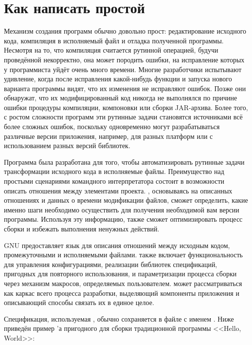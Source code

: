 \chapter{Как написать простой \Makefile{}}
\label{chap:simple_makefile}
Механизм создания программ обычно довольно прост: редактирование
исходного кода, компиляция в исполняемый файл и отладка полученной
программы. Несмотря на то, что компиляция считается рутинной
операцией, будучи проведённой некорректно, она может породить ошибки,
на исправление которых у программиста уйдёт очень много времени.
Многие разработчики испытывают удивление, когда после исправления
какой-нибудь функции и запуска нового варианта программы видят,
что их изменения не исправляют ошибок. Позже они обнаружат, что их
модифицированный код никогда не выполнялся по причине ошибки процедуры
компиляции, компоновки или сборки JAR\hyp{}архива. Более того, с
ростом сложности программ эти рутинные задачи становятся источниками
всё более сложных ошибок, поскольку одновременно могут разрабатываться
различные версии приложения, например, для разных платформ или с
использованием разных версий библиотек.

Программа \GNUmake{} была разработана для того, чтобы автоматизировать
рутинные задачи трансформации исходного кода в исполняемые файлы.
Преимущество \GNUmake{} над простыми сценариями командного
интерпретатора состоит в возможности описать отношения между
элементами проекта. \GNUmake{}, основываясь на описанных отношениях и
данных о времени модификации файлов, сможет определить, какие именно
шаги необходимо осуществить для получения необходимой вам версии
программы. Используя эту информацию, \GNUmake{} также сможет
оптимизировать процесс сборки и избежать выполнения ненужных действий.

GNU \GNUmake{} предоставляет язык для описания отношений между
исходным кодом, промежуточными и исполняемыми файлами.
\GNUmake{} также включает функциональность для управления
конфигурациями, реализации библиотек спецификаций, пригодных для
повторного использования, и параметризации процесса сборки через
механизм макросов, определяемых пользователем. \GNUmake{} может
рассматриваться как каркас всего процесса разработки, выделяющий
компоненты приложения и описывающий способы связать их в единое целое.

Спецификация, используемая \GNUmake{}, обычно сохраняется в файле с
именем \Makefile{}. Ниже приведён пример \Makefile{}'а пригодного для
сборки традиционной программы <<Hello, World>>:

